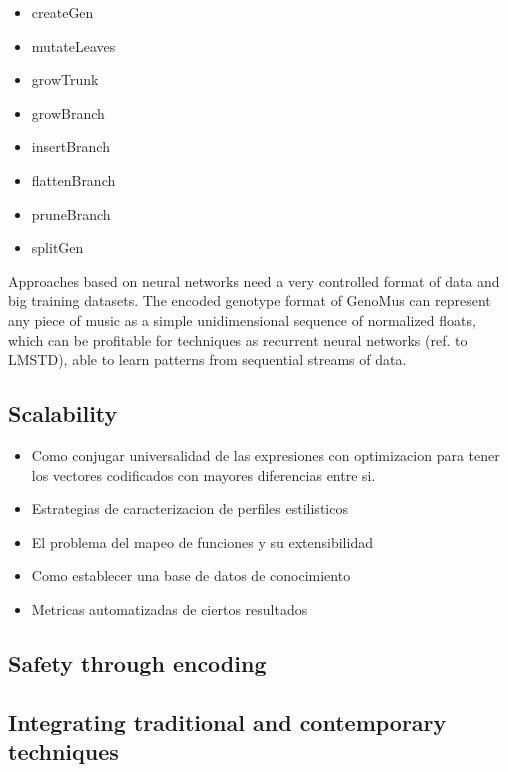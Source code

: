 \documentclass{article}
\begin{document}
\begin{itemize}
\item createGen
\item mutateLeaves
\item growTrunk
\item growBranch
\item insertBranch
\item flattenBranch
\item pruneBranch
\item splitGen

\end{itemize}

Approaches based on neural networks need a very controlled format of data and big training datasets. The encoded genotype format of GenoMus can represent any piece of music as a simple unidimensional sequence of normalized floats, which can be profitable for techniques as recurrent neural networks (ref. to LMSTD), able to learn patterns from sequential streams of data.


\subsection{Scalability}

{\color{gray}


\begin{itemize}
\item Como conjugar universalidad de las expresiones con optimizacion para tener los vectores codificados con mayores diferencias entre si.
\item Estrategias de caracterizacion de perfiles estilisticos
\item El problema del mapeo de funciones y su extensibilidad
\item Como establecer una base de datos de conocimiento
\item Metricas automatizadas de ciertos resultados
\end{itemize}

}

\subsection{Safety through encoding}

\subsection{Integrating traditional and contemporary techniques}
\end{document}
